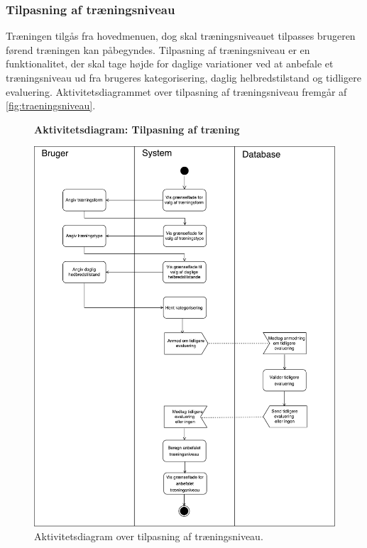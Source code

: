 \subsubsection*{Tilpasning af træningsniveau} \label{sec:traeningsniveau}
Træningen tilgås fra hovedmenuen, dog skal træningsniveauet tilpasses brugeren førend træningen kan påbegyndes. Tilpasning af træningsniveau er en funktionalitet, der skal tage højde for daglige variationer ved at anbefale et træningsniveau ud fra brugeres kategorisering, daglig helbredstilstand og tidligere evaluering.  
Aktivitetsdiagrammet over tilpasning af træningsniveau fremgår af \autoref{fig:traeningsniveau}.

\begin{figure} [H]
\centering
\textbf{Aktivitetsdiagram: Tilpasning af træning}\par\medskip
\includegraphics[width=1\textwidth]{figures/aktivitetsdiagram/Tilpasningaftraeningsniveau}
\caption{Aktivitetsdiagram over tilpasning af træningsniveau.}
\label{fig:traeningsniveau}
\end{figure}

